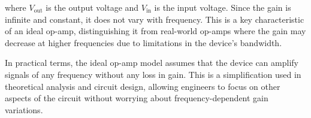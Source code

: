 where \( V_{\text{out}} \) is the output voltage and \( V_{\text{in}} \) is the input voltage. Since the gain is infinite and constant, it does not vary with frequency. This is a key characteristic of an ideal op-amp, distinguishing it from real-world op-amps where the gain may decrease at higher frequencies due to limitations in the device's bandwidth.

In practical terms, the ideal op-amp model assumes that the device can amplify signals of any frequency without any loss in gain. This is a simplification used in theoretical analysis and circuit design, allowing engineers to focus on other aspects of the circuit without worrying about frequency-dependent gain variations.

